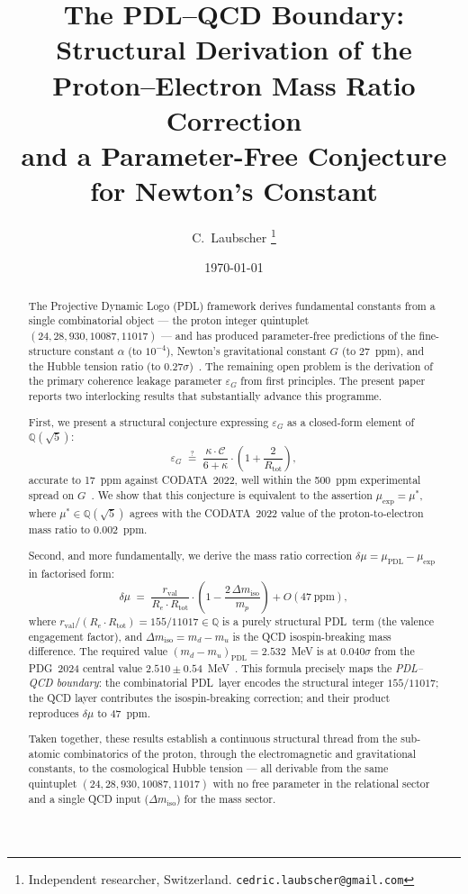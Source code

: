 \documentclass[11pt,a4paper]{article}
\theoremstyle{definition}
\newcommand{\PDL}{\textnormal{PDL}}
\newcommand{\Rtot}{R_{\mathrm{tot}}}
\newcommand{\rval}{r_{\mathrm{val}}}
\newcommand{\epsg}{\varepsilon_G}
\newcommand{\calC}{\mathcal{C}}
\newcommand{\kap}{\kappa}
\newcommand{\muPDL}{\mu_{\mathrm{PDL}}}
\newcommand{\muexp}{\mu_{\mathrm{exp}}}
\newcommand{\mustar}{\mu^*}
\newcommand{\dmu}{\delta\mu}
\newcommand{\dmiso}{\Delta m_{\mathrm{iso}}}
\begin{document}
\title{%
  The PDL--QCD Boundary:\\[4pt]
  Structural Derivation of the Proton--Electron Mass Ratio Correction\\[4pt]
  and a Parameter-Free Conjecture for Newton's Constant%
}
\author{%
  C.~Laubscher%
  \thanks{Independent researcher, Switzerland. \texttt{cedric.laubscher@gmail.com}}\\[4pt]%
}
\date{\small \today}
\maketitle

\begin{abstract}
The Projective Dynamic Logo (\PDL) framework derives fundamental constants from a single combinatorial object --- the proton integer quintuplet $(24, 28, 930, 10087, 11017)$ --- and has produced parameter-free predictions of the fine-structure constant $\alpha$ (to $10^{-4}$), Newton's gravitational constant $G$ (to 27~ppm), and the Hubble tension ratio (to $0.27\sigma$)~\cite{Alpha_PDL_v2_2026,Bridge_PDL_2026,NCMB_PDL_2026}. The remaining open problem is the derivation of the primary coherence leakage parameter $\epsg$ from first principles. The present paper reports two interlocking results that substantially advance this programme.

First, we present a structural conjecture expressing $\epsg$ as a closed-form element of $\mathbb{Q}(\sqrt{5})$:
\[
\epsg \;\overset{?}{=}\; \frac{\kap\cdot\calC}{6+\kap}\cdot\left(1+\frac{2}{\Rtot}\right),
\]
accurate to 17~ppm against CODATA~2022, well within the 500~ppm experimental spread on $G$~\cite{CODATA_2022,Li_2018,NIST_2024}. We show that this conjecture is equivalent to the assertion $\muexp = \mustar$, where $\mustar \in \mathbb{Q}(\sqrt{5})$ agrees with the CODATA~2022 value of the proton-to-electron mass ratio to $0.002$~ppm.

Second, and more fundamentally, we derive the mass ratio correction $\dmu = \muPDL - \muexp$ in factorised form:
\[
\dmu \;=\; \frac{\rval}{R_e\cdot\Rtot}\cdot\left(1 - \frac{2\,\dmiso}{m_p}\right) + O(47\ \mathrm{ppm}),
\]
where $\rval/(R_e\cdot\Rtot) = 155/11017 \in \mathbb{Q}$ is a purely structural \PDL\ term (the valence engagement factor), and $\dmiso = m_d - m_u$ is the QCD isospin-breaking mass difference. The required value $(m_d-m_u)_{\mathrm{PDL}} = 2.532$~MeV is at $0.040\sigma$ from the PDG~2024 central value $2.510 \pm 0.54$~MeV~\cite{PDG_2024}. This formula precisely maps the \emph{PDL--QCD boundary}: the combinatorial \PDL\ layer encodes the structural integer $155/11017$; the QCD layer contributes the isospin-breaking correction; and their product reproduces $\dmu$ to 47~ppm.

Taken together, these results establish a continuous structural thread from the sub-atomic combinatorics of the proton, through the electromagnetic and gravitational constants, to the cosmological Hubble tension --- all derivable from the same quintuplet $(24, 28, 930, 10087, 11017)$ with no free parameter in the relational sector and a single QCD input ($\dmiso$) for the mass sector.
\end{abstract}
\end{document}
